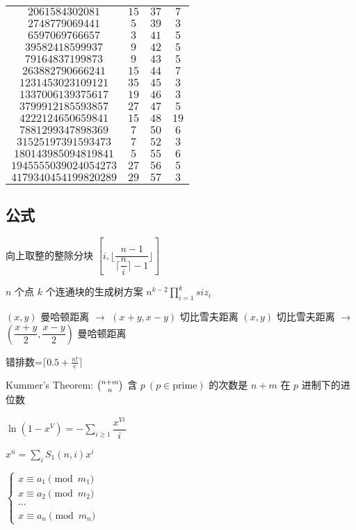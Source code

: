 \documentclass[12pt]{ctexart}
\begin{document}
\begin{table}[H]
\begin{tabular}{c|c|c|c}
		$2061584302081$       & $15$  & $37$ & $7$       \\
		$2748779069441$       & $5$   & $39$ & $3$       \\
		$6597069766657$       & $3$   & $41$ & $5$       \\
		$39582418599937$      & $9$   & $42$ & $5$       \\
		$79164837199873$      & $9$   & $43$ & $5$       \\
		$263882790666241$     & $15$  & $44$ & $7$       \\
		$1231453023109121$    & $35$  & $45$ & $3$       \\
		$1337006139375617$    & $19$  & $46$ & $3$       \\
		$3799912185593857$    & $27$  & $47$ & $5$       \\
		$4222124650659841$    & $15$  & $48$ & $19$      \\
		$7881299347898369$    & $7$   & $50$ & $6$       \\
		$31525197391593473$   & $7$   & $52$ & $3$       \\
		$180143985094819841$  & $5$   & $55$ & $6$       \\
		$1945555039024054273$ & $27$  & $56$ & $5$       \\
		$4179340454199820289$ & $29$  & $57$ & $3$       \\
		\bottomrule
	\end{tabular}

\end{table}
\subsection{公式}

向上取整的整除分块 $[i,\lfloor\dfrac{n-1}{\lceil\dfrac ni \rceil-1}\rfloor]$

$n$ 个点 $k$ 个连通块的生成树方案 $n^{k-2}\prod\limits_{i=1}^k siz_i$

$(x,y)$ 曼哈顿距离 $\to$ $(x+y,x-y)$ 切比雪夫距离
$(x,y)$ 切比雪夫距离 $\to$ $(\dfrac{x+y}{2},\dfrac{x-y}{2})$ 曼哈顿距离

错排数=$\lceil0.5+\frac{n!}{e}\rceil$

Kummer's Theorem: $\tbinom{n+m}{n}$ 含 $p~(p\in \text {prime})$ 的次数是 $n+m$ 在 $p$ 进制下的进位数

$\ln (1-x^V)=-\sum\limits_{i\ge1}\dfrac{x^{Vi}}{i}$

$x^{\bar n}=\sum\limits_i S_1(n,i)x^i$

$\begin{cases}x\equiv a_1\pmod {m_1}\\x\equiv a_2\pmod {m_2}\\\cdots\\x\equiv a_n\pmod {m_n}\end{cases}$
\end{document}

